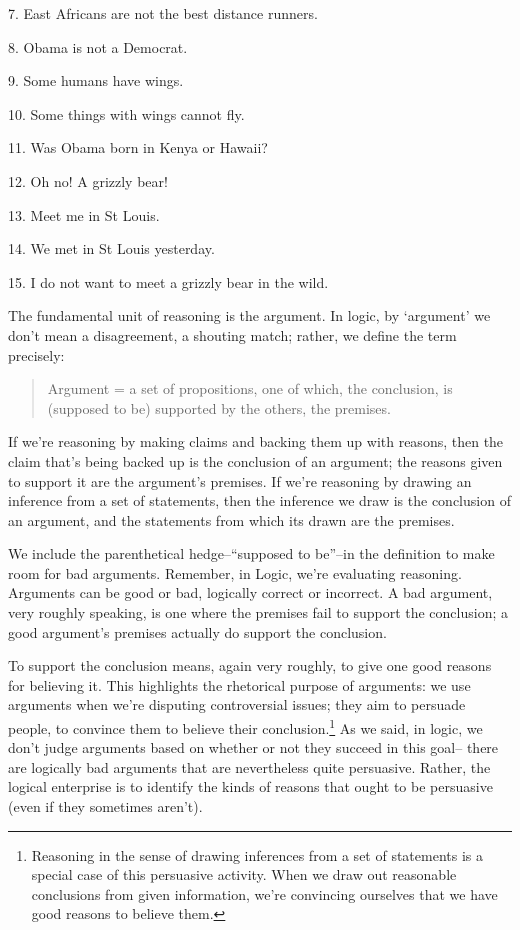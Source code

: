 7.  East Africans are not the best distance runners.

8.  Obama is not a Democrat.

9.  Some humans have wings.

10. Some things with wings cannot fly.

11. Was Obama born in Kenya or Hawaii?

12. Oh no! A grizzly bear!

13. Meet me in St Louis.

14. We met in St Louis yesterday.

15. I do not want to meet a grizzly bear in the wild.


The fundamental unit of reasoning is the argument. In logic, by `argument' we don't mean a
disagreement, a shouting match; rather, we define the term precisely:

\begin{quotation}%
Argument = a set of propositions, one of which, the conclusion, is (supposed to be)
supported by the others, the premises.
\end{quotation}

If we're reasoning by making claims and backing them up with reasons, then the claim that's being
backed up is the conclusion of an argument; the reasons given to support it are the argument's
premises. If we're reasoning by drawing an inference from a set of statements, then the inference
we draw is the conclusion of an argument, and the statements from which its drawn are the
premises.

We include the parenthetical hedge--``supposed to be''--in the definition to make room for bad
arguments. Remember, in Logic, we're evaluating reasoning. Arguments can be good or bad,
logically correct or incorrect. A bad argument, very roughly speaking, is one where the premises
fail to support the conclusion; a good argument's premises actually do support the conclusion.

To support the conclusion means, again very roughly, to give one good reasons for believing it.
This highlights the rhetorical purpose of arguments: we use arguments when we're disputing
controversial issues; they aim to persuade people, to convince them to believe their 
conclusion.\footnote{Reasoning in the sense of drawing inferences from a set of statements is a special case of this persuasive activity.
When we draw out reasonable conclusions from given information, we're convincing ourselves that we have good
reasons to believe them.}
As we said, in logic, we don't judge arguments based on whether or not they succeed in this goal--
there are logically bad arguments that are nevertheless quite persuasive. Rather, the logical
enterprise is to identify the kinds of reasons that ought to be persuasive (even if they sometimes
aren't).

